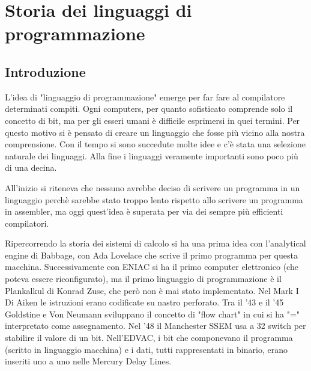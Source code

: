 \chapter{Storia dei linguaggi di programmazione}

\section{Introduzione}

L'idea di "linguaggio di programmazione" emerge per far fare al compilatore determinati
compiti. Ogni computers, per quanto sofisticato comprende solo il concetto di bit, ma
per gli esseri umani è difficile esprimersi in quei termini. Per questo motivo si è
pensato di creare un linguaggio che fosse più vicino alla nostra comprensione. Con il
tempo si sono succedute molte idee e c'è stata una selezione naturale dei linguaggi. Alla fine
i linguaggi veramente importanti sono poco più di una decina.


All'inizio si riteneva che nessuno avrebbe deciso di scrivere un programma in un linguaggio
perchè sarebbe stato troppo lento rispetto allo scrivere un programma in assembler, ma oggi 
quest'idea è superata per via dei sempre più efficienti compilatori.

Ripercorrendo la storia dei sistemi di calcolo si ha una prima idea con l'analytical
engine di Babbage, con Ada Lovelace che scrive il primo programma per questa macchina.
Successivamente con ENIAC si ha il primo computer elettronico (che poteva essere riconfigurato), ma il primo linguaggio
di programmazione è il Plankalkul di Konrad Zuse, che però non è mai stato implementato.
Nel Mark I Di Aiken le istruzioni erano codificate su nastro perforato. Tra il '43 e il '45
Goldstine e Von Neumann sviluppano il concetto di "flow chart" in cui si ha "=" interpretato come 
assegnamento.  Nel '48 il Manchester SSEM usa a 32 switch per stabilire il valore di un bit.
Nell’EDVAC, i bit che componevano il programma (scritto in
linguaggio macchina) e i dati, tutti rappresentati in binario, erano
inseriti uno a uno nelle Mercury Delay Lines. 


